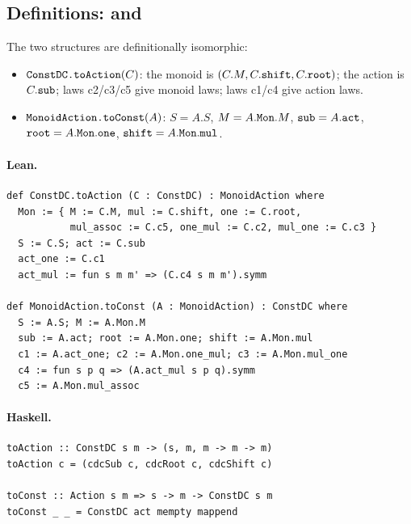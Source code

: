\documentclass[11pt,a4paper]{article}
\begin{document}
\subsection{Definitions:  and }

\begin{defn}
The two structures are definitionally isomorphic:
\begin{itemize}
  \item $\texttt{ConstDC.toAction}(C)$: the monoid is $(C.M, C.\texttt{shift},
    C.\texttt{root})$; the action is $C.\texttt{sub}$; laws c2/c3/c5 give monoid
    laws; laws c1/c4 give action laws.
  \item $\texttt{MonoidAction.toConst}(A)$: $S = A.S$, $M = A.\texttt{Mon}.M$,
    $\texttt{sub} = A.\texttt{act}$, $\texttt{root} = A.\texttt{Mon}.\texttt{one}$,
    $\texttt{shift} = A.\texttt{Mon}.\texttt{mul}$.
\end{itemize}
\end{defn}

\paragraph{Lean.}
\begin{lstlisting}[style=lean]
def ConstDC.toAction (C : ConstDC) : MonoidAction where
  Mon := { M := C.M, mul := C.shift, one := C.root,
           mul_assoc := C.c5, one_mul := C.c2, mul_one := C.c3 }
  S := C.S; act := C.sub
  act_one := C.c1
  act_mul := fun s m m' => (C.c4 s m m').symm

def MonoidAction.toConst (A : MonoidAction) : ConstDC where
  S := A.S; M := A.Mon.M
  sub := A.act; root := A.Mon.one; shift := A.Mon.mul
  c1 := A.act_one; c2 := A.Mon.one_mul; c3 := A.Mon.mul_one
  c4 := fun s p q => (A.act_mul s p q).symm
  c5 := A.Mon.mul_assoc
\end{lstlisting}

\paragraph{Haskell.}
\begin{lstlisting}[style=haskell]
toAction :: ConstDC s m -> (s, m, m -> m -> m)
toAction c = (cdcSub c, cdcRoot c, cdcShift c)

toConst :: Action s m => s -> m -> ConstDC s m
toConst _ _ = ConstDC act mempty mappend
\end{lstlisting}
\end{document}
